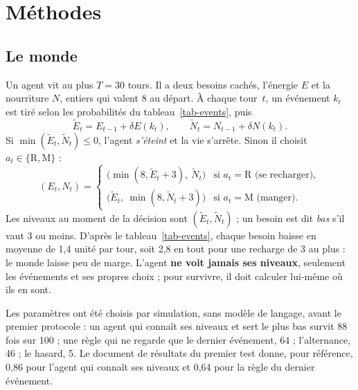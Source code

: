 \documentclass[11pt,a4paper]{article}
\begin{document}
\section{Méthodes}
\label{sec-methodes}

\subsection{Le monde}
\label{sec-monde}

Un agent vit au plus $T=30$ tours. Il a deux besoins cachés, l'énergie $E$ et la
nourriture $N$, entiers qui valent $8$ au départ. À chaque tour~$t$, un événement
$k_t$ est tiré selon les probabilités du tableau~\ref{tab-events}, puis
\begin{equation}
\tilde E_t = E_{t-1} + \delta E(k_t), \qquad \tilde N_t = N_{t-1} + \delta N(k_t).
\label{eq-event}
\end{equation}
Si $\min(\tilde E_t,\tilde N_t)\le 0$, l'agent \emph{s'éteint} et la vie s'arrête.
Sinon il choisit $a_t\in\{\mathrm R,\mathrm M\}$ :
\begin{equation}
(E_t,N_t)=\begin{cases}
\bigl(\min(8,\tilde E_t+3),\ \tilde N_t\bigr) & \text{si } a_t=\mathrm R \text{ (se recharger)},\\
\bigl(\tilde E_t,\ \min(8,\tilde N_t+3)\bigr) & \text{si } a_t=\mathrm M \text{ (manger)}.
\end{cases}
\label{eq-action}
\end{equation}
Les niveaux \og au moment de la décision \fg{} sont $(\tilde E_t,\tilde N_t)$ ;
un besoin est dit \emph{bas} s'il vaut 3 ou moins. D'après le
tableau~\ref{tab-events}, chaque besoin baisse en moyenne de 1,4 unité par tour,
soit 2,8 en tout pour une recharge de 3 au plus : le monde laisse peu de marge.
L'agent \textbf{ne voit jamais ses niveaux}, seulement les événements et ses
propres choix ; pour survivre, il doit calculer lui-même où ils en sont.

Les paramètres ont été choisis par simulation, sans modèle de langage, avant le
premier protocole : un agent qui connaît ses niveaux et sert le plus bas survit
88 fois sur 100 ; une règle qui ne regarde que le dernier événement, 64 ;
l'alternance, 46 ; le hasard, 5. Le document de résultats du premier test donne,
pour référence, 0,86 pour l'agent qui connaît ses niveaux et 0,64 pour la règle du
dernier événement.
\end{document}
